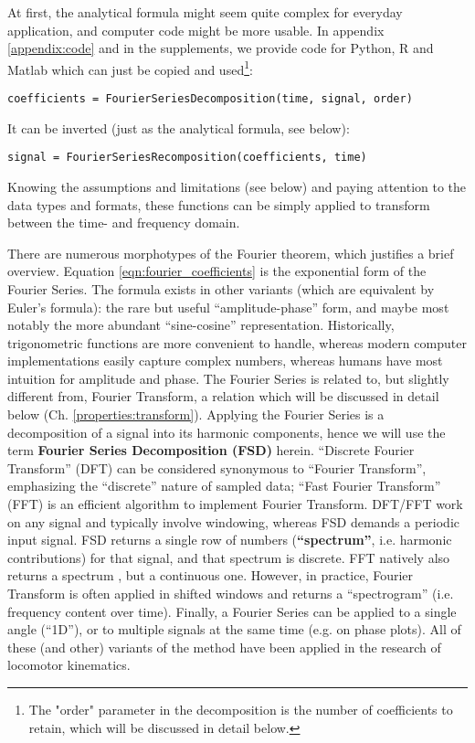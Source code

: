 \documentclass[10pt,a4paper]{article}
\begin{document}
At first, the analytical formula might seem quite complex for everyday application, and computer code might be more usable.
In appendix \ref{appendix:code} and in the supplements, we provide code for Python, R and Matlab which can just be copied and used\footnote{The "order" parameter in the decomposition is the number of coefficients to retain, which will be discussed in detail below.}:
\begin{verbatim}
coefficients = FourierSeriesDecomposition(time, signal, order)
\end{verbatim}

It can be inverted (just as the analytical formula, see below):
\begin{verbatim}
signal = FourierSeriesRecomposition(coefficients, time)
\end{verbatim}

Knowing the assumptions and limitations (see below) and paying attention to the data types and formats, these functions can be simply applied to transform between the time- and frequency domain.


\bigskip
There are numerous morphotypes of the Fourier theorem, which justifies a brief overview.
Equation \eqref{eqn:fourier_coefficients} is the exponential form of the Fourier Series.
The formula exists in other variants (which are equivalent by Euler's formula): the rare but useful ``amplitude-phase'' form, and maybe most notably the more abundant ``sine-cosine'' representation.
Historically, trigonometric functions are more convenient to handle, whereas modern computer implementations easily capture complex numbers, whereas humans have most intuition for amplitude and phase.
The Fourier Series is related to, but slightly different from, Fourier Transform, a relation which will be discussed in detail below (Ch. \ref{properties:transform}).
Applying the Fourier Series is a decomposition of a signal into its harmonic components, hence we will use the term \textbf{Fourier Series Decomposition (FSD)} herein.
``Discrete Fourier Transform'' (DFT) can be considered synonymous to ``Fourier Transform'', emphasizing the ``discrete'' nature of sampled data; ``Fast Fourier Transform'' (FFT) is an efficient algorithm to implement Fourier Transform.
DFT/FFT work on any signal and typically involve windowing, whereas FSD demands a periodic input signal.
FSD returns a single row of numbers (\textbf{``spectrum''}, i.e. harmonic contributions) for that signal, and that spectrum is discrete.
FFT natively also returns a spectrum \citep{Welch1967}, but a continuous one.
However, in practice, Fourier Transform is often applied in shifted windows and returns a ``spectrogram'' (i.e. frequency content over time).
Finally, a Fourier Series can be applied to a single angle (``1D''), or to multiple signals at the same time (e.g. on phase plots).
All of these (and other) variants of the method have been applied in the research of locomotor kinematics.
\end{document}
